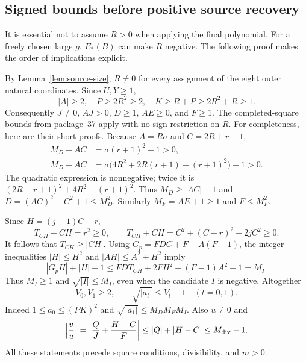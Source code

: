 \subsection{Signed bounds before positive source recovery}

It is essential not to assume $R>0$ when applying the final polynomial.
For a freely chosen large $g$, $E_*(B)$ can make $R$ negative. The
following proof makes the order of implications explicit.

By Lemma~\ref{lem:source-size}, $R\ne0$ for every assignment of
the eight outer natural coordinates. Since $U,Y\ge1$,
\[
 |A|\ge2,\quad P\ge2R^2\ge2,\quad
 K\ge R+P\ge2R^2+R\ge1.
\]
Consequently $J\ne0$, $AJ>0$, $D\ge1$, $AE\ge0$, and $F\ge1$.
The completed-square bounds from package~37 apply with no sign
restriction on $R$. For completeness, here are their short proofs.
Because $A=R\sigma$ and $C=2R+r+1$,
\begin{align*}
 M_D-AC&=\sigma(r+1)^2+1>0,\\
 M_D+AC&=\sigma\bigl(4R^2+2R(r+1)+(r+1)^2\bigr)+1>0.
\end{align*}
The quadratic expression is nonnegative; twice it is
$(2R+r+1)^2+4R^2+(r+1)^2$.
Thus $M_D\ge|AC|+1$ and
$D=(AC)^2-C^2+1\le M_D^2$.
Similarly $M_F=AE+1\ge1$ and $F\le M_F^2$.

Since $H=(j+1)C-r$,
\[
 T_{CH}-CH=r^2\ge0,\qquad
 T_{CH}+CH=C^2+(C-r)^2+2jC^2\ge0.
\]
It follows that $T_{CH}\ge|CH|$.
Using $G_p=FDC+F-A(F-1)$, the integer inequalities
$|H|\le H^2$ and $|AH|\le A^2+H^2$ imply
\[
 |G_pH|+|H|+1
 \le FDT_{CH}+2FH^2+(F-1)A^2+1=M_I.
\]
Thus $M_I\ge1$ and $\sqrt{|I|}\le M_I$, even when the candidate
$I$ is negative. Altogether
\begin{equation}
 V_0,V_1\ge2,\qquad
 \sqrt{|a_t|}\le V_t-1\quad(t=0,1).
 \label{eq:root-bounds}
\end{equation}
Indeed $1\le a_0\le(PK)^2$ and
$\sqrt{|a_1|}\le M_DM_FM_I$. Also $u\ne0$ and
\begin{equation}
 \left|\frac vu\right|
 =\left|\frac QJ+\frac{H-C}{F}\right|
 \le|Q|+|H-C|\le M_{\rm div}-1.
 \label{eq:quotient-bound}
\end{equation}
All these statements precede square conditions, divisibility, and $m>0$.


